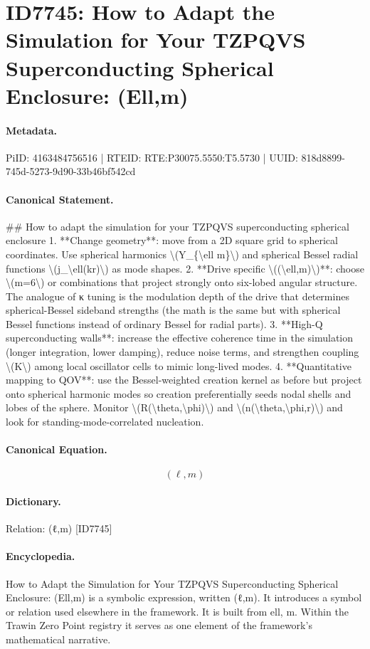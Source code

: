 \section*{ID7745: How to Adapt the Simulation for Your TZPQVS Superconducting Spherical Enclosure: (Ell,m)}
\paragraph{Metadata.}
PiID: 4163484756516 | RTEID: RTE:P30075.5550:T5.5730 | UUID: 818d8899-745d-5273-9d90-33b46bf542cd

\paragraph{Canonical Statement.}
\#\# How to adapt the simulation for your TZPQVS superconducting spherical enclosure 1. **Change geometry**: move from a 2D square grid to spherical coordinates. Use spherical harmonics \textbackslash{}(Y\_\{\textbackslash{}ell m\}\textbackslash{}) and spherical Bessel radial functions \textbackslash{}(j\_\textbackslash{}ell(kr)\textbackslash{}) as mode shapes. 2. **Drive specific \textbackslash{}((\textbackslash{}ell,m)\textbackslash{})**: choose \textbackslash{}(m=6\textbackslash{}) or combinations that project strongly onto six-lobed angular structure. The analogue of κ tuning is the modulation depth of the drive that determines spherical-Bessel sideband strengths (the math is the same but with spherical Bessel functions instead of ordinary Bessel for radial parts). 3. **High-Q superconducting walls**: increase the effective coherence time in the simulation (longer integration, lower damping), reduce noise terms, and strengthen coupling \textbackslash{}(K\textbackslash{}) among local oscillator cells to mimic long-lived modes. 4. **Quantitative mapping to QOV**: use the Bessel-weighted creation kernel as before but project onto spherical harmonic modes so creation preferentially seeds nodal shells and lobes of the sphere. Monitor \textbackslash{}(R(\textbackslash{}theta,\textbackslash{}phi)\textbackslash{}) and \textbackslash{}(n(\textbackslash{}theta,\textbackslash{}phi,r)\textbackslash{}) and look for standing-mode-correlated nucleation.

\paragraph{Canonical Equation.}
\[
(\ell,m)
\]

\paragraph{Dictionary.}
Relation: (ℓ,m) [ID7745]

\paragraph{Encyclopedia.}
How to Adapt the Simulation for Your TZPQVS Superconducting Spherical Enclosure: (Ell,m) is a symbolic expression, written (ℓ,m). It introduces a symbol or relation used elsewhere in the framework. It is built from ell, m. Within the Trawin Zero Point registry it serves as one element of the framework's mathematical narrative.
